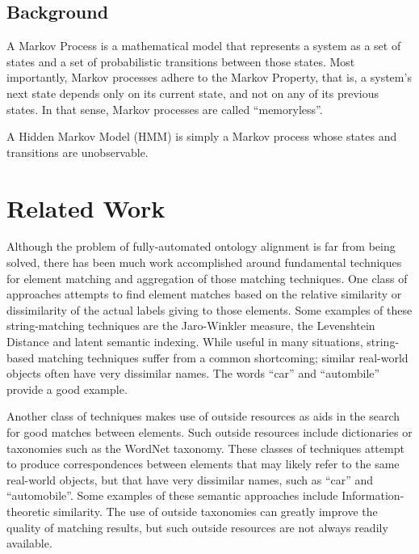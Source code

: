 \documentclass[letterpaper,twocolumn,12pt]{article}
\begin{document}
\subsection{Background}

A Markov Process is a mathematical model that represents a system as a set of states
and a set of probabilistic transitions between those states. Most importantly, Markov 
processes adhere to the Markov Property, that is, a system's next state depends only
on its current state, and not on any of its previous states. In that sense, Markov
processes are called ``memoryless''.

A Hidden Markov Model (HMM) is simply a Markov process whose states and transitions
are unobservable.

\section{Related Work}

Although the problem of fully-automated ontology alignment is far from being solved,
there has been much work accomplished around fundamental techniques for element
matching and aggregation of those matching techniques. One class of approaches
attempts to find element matches based on the relative similarity or dissimilarity
of the actual labels giving to those elements. Some examples of these string-matching 
techniques are the Jaro-Winkler measure, the Levenshtein Distance and latent semantic 
indexing.
%
While useful in many situations, string-based matching techniques suffer from a common 
shortcoming; similar real-world objects often have very dissimilar names. The words
``car'' and ``autombile'' provide a good example.

Another class of techniques makes use of outside resources as aids in the search for
good matches between elements. Such outside resources include dictionaries or taxonomies
such as the WordNet taxonomy. These classes of techniques attempt to produce correspondences
between elements that may likely refer to the same real-world objects, but that have very
dissimilar names, such as ``car'' and ``automobile''. Some examples of these semantic 
approaches include Information-theoretic similarity.
%
The use of outside taxonomies can greatly improve the quality of matching results,
but such outside resources are not always readily available.
\end{document}
